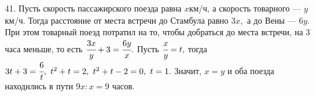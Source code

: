 41. Пусть скорость пассажирского поезда равна $x$км/ч, а скорость товарного --- $y$км/ч. Тогда расстояние от места встречи до Стамбула равно $3x,$ а до Вены --- $6y.$ При этом товарный поезд потратил на то, чтобы добраться до места встречи, на 3 часа меньше, то есть $\cfrac{3x}{y}+3=\cfrac{6y}{x}.$ Пусть $\cfrac{x}{y}=t,$ тогда $3t+3=\cfrac{6}{t},\ t^2+t=2,\ t^2+t-2=0,\ t=1.$ Значит, $x=y$ и оба поезда находились в пути $9x:x=9$ часов.\\
